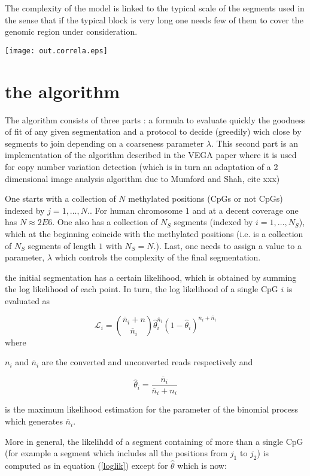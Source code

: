 \documentclass[11pt]{amsart}
\newcommand{\lik}{\ensuremath{\mathcal{L}}}
\begin{document}
The complexity of the model is linked to the typical scale of the segments used in the sense that if the typical block is very long one needs few of them to cover the genomic region under consideration.

\texttt{[image: out.correla.eps]}

\section{the algorithm}

The algorithm consists of three parts : a formula to evaluate quickly the goodness of fit of any given segmentation
and a protocol to decide (greedily) wich close by segments to join depending on a coarseness parameter $\lambda$. This second
part is an implementation of the algorithm described in the VEGA paper where it is used for copy number variation detection (which is in turn an adaptation of a 2 dimensional image analysis algorithm due to Mumford and Shah, cite xxx)


One starts with a collection of $N$ methylated positions (CpGs or not CpGs) indexed by $j=1,\dots,N$.. For human chromosome $1$ and at a 
decent coverage one has $N \approx 2E6$. One also has a collection of $N_S$ segments (indexed by $i=1,\dots,N_S$), 
which at the beginning
coincide with the methylated positions (i.e. is a collection of $N_S$ segments of length $1$ with $N_S=N$.).
Last, one needs to assign a value to a parameter, $\lambda$ which controls the complexity of the final segmentation.

the initial segmentation has a certain likelihood, which is obtained by summing the log likelihood of each point. In turn, 
the log likelihood of a single CpG $i$ is evaluated as 

\[\lik_i={\overline{n}_i+n \choose \overline{n}_i}\hat{\theta}_i^{\overline{n}_i}(1-\hat{\theta}_i)^{n_i+\overline{n}_i}\]
\label{loglik}
where

$n_i$ and $\overline{n}_i$ are the converted and unconverted reads respectively and

\[\hat{\theta}_i=\frac{\overline{n}_i}{\overline{n}_i+n_i}\]

is the maximum likelihood estimation for the parameter of the binomial process which generates $\overline{n}_i$.

More in general, the likelihdd of a segment containing of more than a single CpG  (for example a segment which includes all the positions from $j_1$ to $j_2$) is computed as in equation (\ref{loglik}) except for $\hat{\theta}$ which is now:
\end{document}
